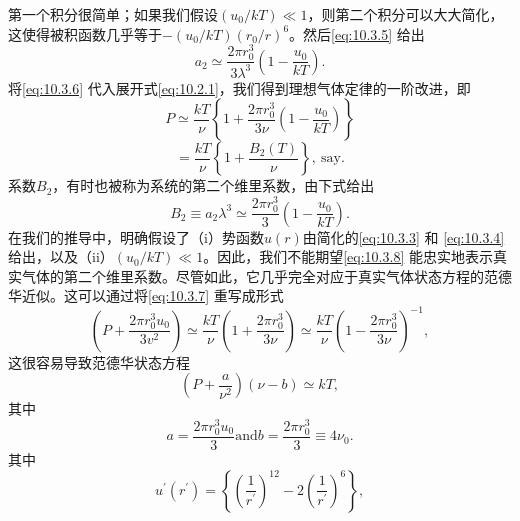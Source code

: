 第一个积分很简单；如果我们假设\((u_0/kT) \ll 1\)，则第二个积分可以大大简化，这使得被积函数几乎等于\(-(u_0/kT)(r_0/r)^6\)。然后\autoref{eq:10.3.5} 给出
\begin{equation}\tag{10.3.6}\label{eq:10.3.6}
a _ { 2 } \simeq \frac { 2 \pi r _ { 0 } ^{3} } { 3 \lambda ^{3} } \left( 1 - \frac { u _ { 0 } } { k T } \right) .
\end{equation}
将\autoref{eq:10.3.6} 代入展开式\autoref{eq:10.2.1}，我们得到理想气体定律的一阶改进，即
\begin{equation}\tag{10.3.7}\label{eq:10.3.7}
P \simeq \frac { k T } { \nu } \left\{ 1 + \frac { 2 \pi r _ { 0 } ^{3} } { 3 \nu } \left( 1 - \frac { u _ { 0 } } { k T } \right) \right\}
\end{equation}
\begin{equation}\tag{10.3.8}\label{eq:10.3.8}
= \frac { k T } { \nu } \left\{ 1 + \frac { B _ { 2 } ( T ) } { \nu } \right\} , \mathrm { ~ s a y } .
\end{equation}
系数\(B_{2}\)，有时也被称为系统的第二个维里系数，由下式给出
\begin{equation}\tag{10.3.9}\label{eq:10.3.9}
B _ { 2 } \equiv a _ { 2 } \lambda ^{3} \simeq \frac { 2 \pi r _ { 0 } ^{3} } { 3 } \left( 1 - \frac { u _ { 0 } } { k T } \right) .
\end{equation}
在我们的推导中，明确假设了（i）势函数\(u(r)\)由简化的\autoref{eq:10.3.3} 和 \autoref{eq:10.3.4} 给出，以及（ii）\((u_0/kT) \ll 1\)。因此，我们不能期望\autoref{eq:10.3.8} 能忠实地表示真实气体的第二个维里系数。尽管如此，它几乎完全对应于真实气体状态方程的范德华近似。这可以通过将\autoref{eq:10.3.7} 重写成形式
\begin{equation}\tag{10.3.10}\label{eq:10.3.10}
\left( P + \frac { 2 \pi r _ { 0 } ^{3} u _ { 0 } } { 3 v ^{2} } \right) \simeq \frac { k T } { \nu } \left( 1 + \frac { 2 \pi r _ { 0 } ^{3} } { 3 \nu } \right) \simeq \frac { k T } { \nu } \left( 1 - \frac { 2 \pi r _ { 0 } ^{3} } { 3 \nu } \right) ^{- 1} ,
\end{equation}
这很容易导致范德华状态方程
\begin{equation}\tag{10.3.11}\label{eq:10.3.11}
\left( P + \frac { a } { \nu ^{2} } \right) ( \nu - b ) \simeq k T ,
\end{equation}
其中
\begin{equation}\tag{10.3.12}\label{eq:10.3.12}
a = \frac { 2 \pi r _ { 0 } ^{3} u _ { 0 } } { 3 }  \mathrm { a n d }  b = \frac { 2 \pi r _ { 0 } ^{3} } { 3 } \equiv 4 \nu _ { 0 } .
\end{equation}
其中
\begin{equation}\tag{10.3.13}\label{eq:10.3.13}
u ^{\prime} ( r ^{\prime} ) = \left\{ \left( \frac { 1 } { r ^{\prime} } \right) ^{12} - 2 \left( \frac { 1 } { r ^{\prime} } \right) ^{6} \right\} ,
\end{equation}
